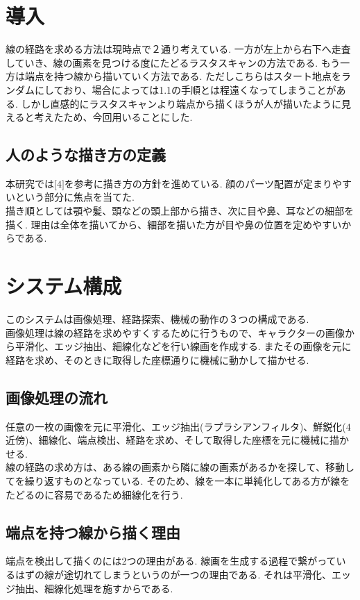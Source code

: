 \documentclass[a4j]{jarticle}			%
\begin{document}
\begin{multicols}{2} %

\section{導入}
線の経路を求める方法は現時点で２通り考えている. 
一方が左上から右下へ走査していき、線の画素を見つける度にたどるラスタスキャンの方法である. 
もう一方は端点を持つ線から描いていく方法である.
ただしこちらはスタート地点をランダムにしており、場合によっては1.1の手順とは程遠くなってしまうことがある. 
しかし直感的にラスタスキャンより端点から描くほうが人が描いたように見えると考えたため、今回用いることにした.

\subsection{人のような描き方の定義}
本研究では$\lbrack4\rbrack$を参考に描き方の方針を進めている.
顔のパーツ配置が定まりやすいという部分に焦点を当てた.\\
描き順としては顎や髪、頭などの頭上部から描き、次に目や鼻、耳などの細部を描く.
理由は全体を描いてから、細部を描いた方が目や鼻の位置を定めやすいからである.

\section{システム構成}
このシステムは画像処理、経路探索、機械の動作の３つの構成である.\\
画像処理は線の経路を求めやすくするために行うもので、キャラクターの画像から平滑化、エッジ抽出、細線化などを行い線画を作成する. 
またその画像を元に経路を求め、そのときに取得した座標通りに機械に動かして描かせる.\\ 

\subsection{画像処理の流れ}
任意の一枚の画像を元に平滑化、エッジ抽出(ラプラシアンフィルタ)、鮮鋭化(4近傍)、細線化、端点検出、経路を求め、そして取得した座標を元に機械に描かせる.\\ 
線の経路の求め方は、ある線の画素から隣に線の画素があるかを探して、移動してを繰り返すものとなっている.
そのため、線を一本に単純化してある方が線をたどるのに容易であるため細線化を行う.


\subsection{端点を持つ線から描く理由}
端点を検出して描くのには2つの理由がある.
線画を生成する過程で繋がっているはずの線が途切れてしまうというのが一つの理由である.
それは平滑化、エッジ抽出、細線化処理を施すからである.

\end{multicols}
\end{document}
